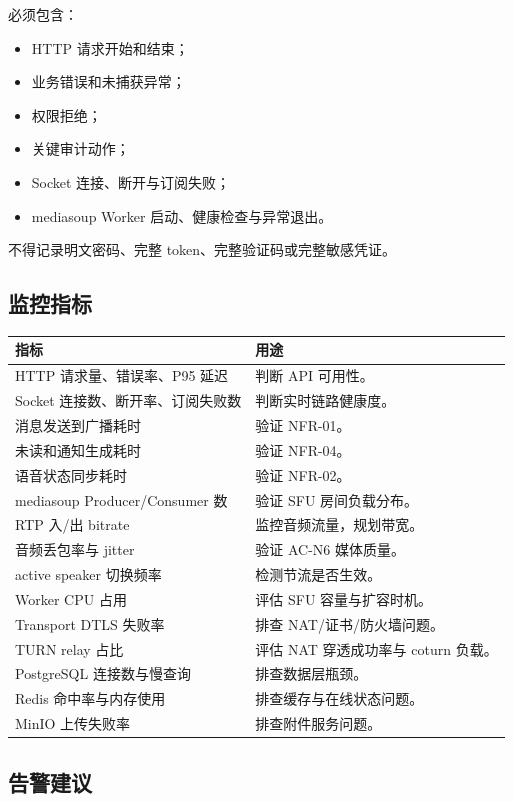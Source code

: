 必须包含：

\begin{itemize}
  \item HTTP 请求开始和结束；
  \item 业务错误和未捕获异常；
  \item 权限拒绝；
  \item 关键审计动作；
  \item Socket 连接、断开与订阅失败；
  \item mediasoup Worker 启动、健康检查与异常退出。
\end{itemize}

不得记录明文密码、完整 token、完整验证码或完整敏感凭证。

\subsection{监控指标}

\noindent\begin{tabularx}{\textwidth}{L{4.8cm}Y}
  \toprule
  指标 & 用途 \\
  \midrule
  HTTP 请求量、错误率、P95 延迟 & 判断 API 可用性。 \\
  Socket 连接数、断开率、订阅失败数 & 判断实时链路健康度。 \\
  消息发送到广播耗时 & 验证 NFR-01。 \\
  未读和通知生成耗时 & 验证 NFR-04。 \\
  语音状态同步耗时 & 验证 NFR-02。 \\
  mediasoup Producer/Consumer 数 & 验证 SFU 房间负载分布。 \\
  RTP 入/出 bitrate & 监控音频流量，规划带宽。 \\
  音频丢包率与 jitter & 验证 AC-N6 媒体质量。 \\
  active speaker 切换频率 & 检测节流是否生效。 \\
  Worker CPU 占用 & 评估 SFU 容量与扩容时机。 \\
  Transport DTLS 失败率 & 排查 NAT/证书/防火墙问题。 \\
  TURN relay 占比 & 评估 NAT 穿透成功率与 coturn 负载。 \\
  PostgreSQL 连接数与慢查询 & 排查数据层瓶颈。 \\
  Redis 命中率与内存使用 & 排查缓存与在线状态问题。 \\
  MinIO 上传失败率 & 排查附件服务问题。 \\
  \bottomrule
\end{tabularx}

\subsection{告警建议}

